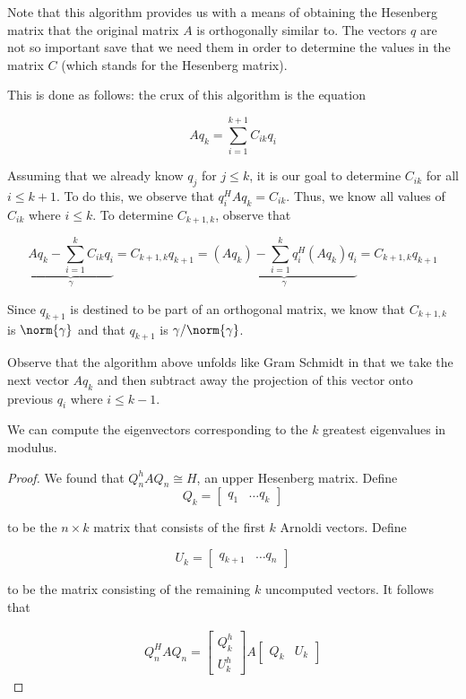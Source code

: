 \documentclass[../main.tex]{subfiles}
\begin{document}
\begin{remark}
    Note that this algorithm provides us with a means of obtaining the Hesenberg matrix that the original matrix $A$ is orthogonally similar to. The vectors $q$ are not so important save that we need them in order to determine the values in the matrix $C$ (which stands for the Hesenberg matrix).

    This is done as follows: the crux of this algorithm is the equation

    \[
        Aq_k = \sum_{i=1}^{k+1}C_{ik}q_{i}
    \]

    Assuming that we already know $q_j$ for $j \leq k$, it is our goal to determine $C_{ik}$ for all $i \leq k+1$. To do this, we observe that $q_i^HAq_k = C_{ik}$. Thus, we know all values of $C_{ik}$ where $i \leq k$. To determine $C_{k+1,k}$, observe that

    \[
        \underbrace{Aq_k - \sum_{i=1}^{k}C_{ik}q_{i}}_{\gamma} = C_{k+1, k} q_{k+1}
        = \underbrace{(Aq_k) - \sum_{i=1}^{k}q_i^H (Aq_k)q_{i}}_{\gamma} = C_{k+1, k} q_{k+1}
    \]

    Since $q_{k+1}$ is destined to be part of an orthogonal matrix, we know that $C_{k+1,k}$ is $\norm{\gamma}$ and that $q_{k+1}$ is $\gamma/\norm{\gamma}$.

    Observe that the algorithm above unfolds like Gram Schmidt in that we take the next vector $Aq_k$ and then subtract away the projection of this vector onto previous $q_i$ where $i \leq k-1$.
\end{remark}

\begin{proposition}
    We can compute the eigenvectors corresponding to the $k$ greatest eigenvalues in modulus.
\end{proposition}

\begin{proof}
    We found that $Q_n^h A Q_n \cong H$, an upper Hesenberg matrix. Define 
    \[
        Q_{k} = \begin{bmatrix}
            q_1 & \dots q_k
        \end{bmatrix}
    \]

    to be the $n \times k$ matrix that consists of the first $k$ Arnoldi vectors. Define

    \[
        U_{k} = \begin{bmatrix}
            q_{k+1} & \dots q_{n}
        \end{bmatrix}
    \]

    to be the matrix consisting of the remaining $k$ uncomputed vectors. It follows that

    \begin{align*}
        Q_n^H A Q_n = 
        \begin{bmatrix}
            Q_k^h \\
            U_k^h
        \end{bmatrix}
        A
        \begin{bmatrix}
            Q_k & U_k
        \end{bmatrix}
    \end{align*}
\end{proof}
\end{document}
